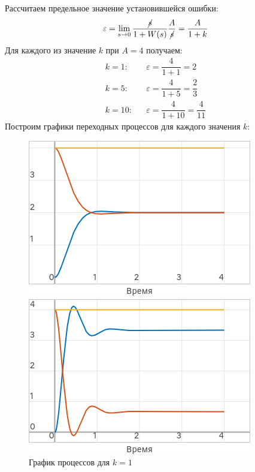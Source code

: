 \documentclass[a4paper]{article}
\begin{document}
Рассчитаем предельное значение установившейся ошибки:
$$\varepsilon = \lim_{s \to 0} \frac{\cancel{s}}{1 + W(s)}\frac{A}{\cancel{s}} = \frac{A}{1+k}$$
Для каждого из значение $k$ при $A = 4$ получаем:
\begin{eqnarray*}
    k = 1: & &\varepsilon = \dfrac{4}{1 + 1} = 2 \\
    k = 5: & &\varepsilon = \dfrac{4}{1 + 5} = \dfrac{2}{3} \\
    k = 10: & &\varepsilon = \dfrac{4}{1 + 10} = \dfrac{4}{11}
\end{eqnarray*}
Построим графики переходных процессов для каждого значения $k$:
\begin{figure}[H]
    \centering
    \begin{minipage}{0.32\textwidth}
        \includegraphics[width=\textwidth]{sources/task1_A_k=1.png}
        \caption*{График процессов для $k = 1$}
    \end{minipage}
    \hfill
    \begin{minipage}{0.32\textwidth}
        \includegraphics[width=\textwidth]{sources/task1_A_k=5.png}

\end{minipage}
\end{figure}
\end{document}
